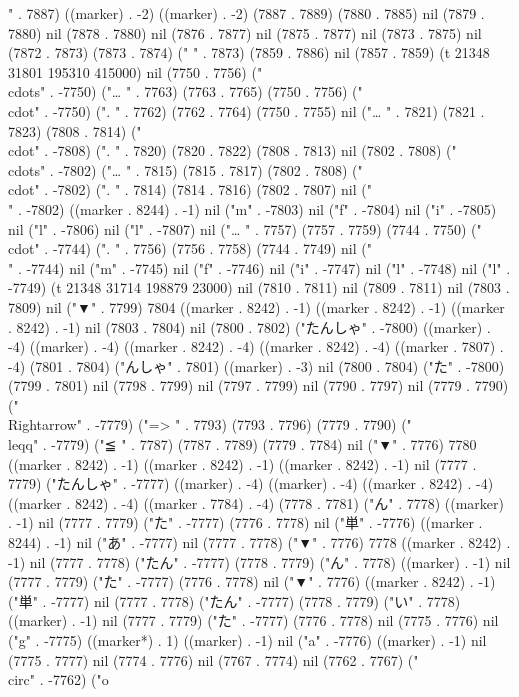 " . 7887) ((marker) . -2) ((marker) . -2) (7887 . 7889) (7880 . 7885) nil (7879 . 7880) nil (7878 . 7880) nil (7876 . 7877) nil (7875 . 7877) nil (7873 . 7875) nil (7872 . 7873) (7873 . 7874) ("  " . 7873) (7859 . 7886) nil (7857 . 7859) (t 21348 31801 195310 415000) nil (7750 . 7756) ("\\cdots" . -7750) ("…
" . 7763) (7763 . 7765) (7750 . 7756) ("\\cdot" . -7750) (".
" . 7762) (7762 . 7764) (7750 . 7755) nil ("…
" . 7821) (7821 . 7823) (7808 . 7814) ("\\cdot" . -7808) (".
" . 7820) (7820 . 7822) (7808 . 7813) nil (7802 . 7808) ("\\cdots" . -7802) ("…
" . 7815) (7815 . 7817) (7802 . 7808) ("\\cdot" . -7802) (".
" . 7814) (7814 . 7816) (7802 . 7807) nil ("\\" . -7802) ((marker . 8244) . -1) nil ("m" . -7803) nil ("f" . -7804) nil ("i" . -7805) nil ("l" . -7806) nil ("l" . -7807) nil ("…
" . 7757) (7757 . 7759) (7744 . 7750) ("\\cdot" . -7744) (".
" . 7756) (7756 . 7758) (7744 . 7749) nil ("\\" . -7744) nil ("m" . -7745) nil ("f" . -7746) nil ("i" . -7747) nil ("l" . -7748) nil ("l" . -7749) (t 21348 31714 198879 23000) nil (7810 . 7811) nil (7809 . 7811) nil (7803 . 7809) nil ("▼" . 7799) 7804 ((marker . 8242) . -1) ((marker . 8242) . -1) ((marker . 8242) . -1) nil (7803 . 7804) nil (7800 . 7802) ("たんしゃ" . -7800) ((marker) . -4) ((marker) . -4) ((marker . 8242) . -4) ((marker . 8242) . -4) ((marker . 7807) . -4) (7801 . 7804) ("んしゃ" . 7801) ((marker) . -3) nil (7800 . 7804) ("た" . -7800) (7799 . 7801) nil (7798 . 7799) nil (7797 . 7799) nil (7790 . 7797) nil (7779 . 7790) ("\\Rightarrow" . -7779) ("=>
" . 7793) (7793 . 7796) (7779 . 7790) ("\\leqq" . -7779) ("≦
" . 7787) (7787 . 7789) (7779 . 7784) nil ("▼" . 7776) 7780 ((marker . 8242) . -1) ((marker . 8242) . -1) ((marker . 8242) . -1) nil (7777 . 7779) ("たんしゃ" . -7777) ((marker) . -4) ((marker) . -4) ((marker . 8242) . -4) ((marker . 8242) . -4) ((marker . 7784) . -4) (7778 . 7781) ("ん" . 7778) ((marker) . -1) nil (7777 . 7779) ("た" . -7777) (7776 . 7778) nil ("単" . -7776) ((marker . 8244) . -1) nil ("あ" . -7777) nil (7777 . 7778) ("▼" . 7776) 7778 ((marker . 8242) . -1) nil (7777 . 7778) ("たん" . -7777) (7778 . 7779) ("ん" . 7778) ((marker) . -1) nil (7777 . 7779) ("た" . -7777) (7776 . 7778) nil ("▼" . 7776) ((marker . 8242) . -1) ("単" . -7777) nil (7777 . 7778) ("たん" . -7777) (7778 . 7779) ("い" . 7778) ((marker) . -1) nil (7777 . 7779) ("た" . -7777) (7776 . 7778) nil (7775 . 7776) nil ("g" . -7775) ((marker*) . 1) ((marker) . -1) nil ("a" . -7776) ((marker) . -1) nil (7775 . 7777) nil (7774 . 7776) nil (7767 . 7774) nil (7762 . 7767) ("\\circ" . -7762) ("o
